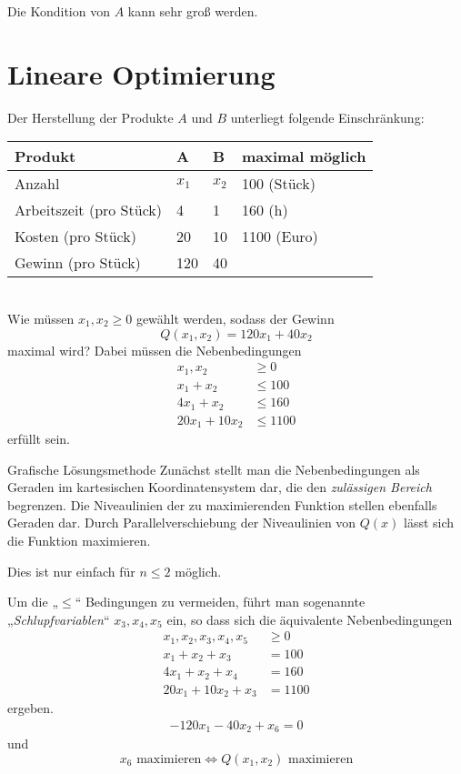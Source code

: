\documentclass{mycourse}
\begin{document}
\begin{note}
	Die Kondition von $A$ kann sehr groß werden.
\end{note}


\section{Lineare Optimierung}


\begin{ex}[Produktionsproblem]
	\label{ex:5.2}
	Der Herstellung der Produkte $A$ und $B$ unterliegt folgende Einschränkung: \\
	\begin{tabular}{l|l|l|l}
		Produkt & A & B & maximal möglich\\
		\hline
		Anzahl & $x_1$ & $x_2$ & 100 (Stück)\\
		Arbeitszeit (pro Stück) & 4 & 1 & 160 (h)\\
		Kosten (pro Stück) & 20 & 10 & 1100 (Euro)\\
		Gewinn (pro Stück) & 120 & 40 & 
	\end{tabular}\\
	Wie müssen $x_1,x_2\ge 0$ gewählt werden, sodass der Gewinn
	\[
		Q(x_1,x_2) = 120x_1 + 40x_2
	\]
	maximal wird?
	Dabei müssen die Nebenbedingungen
	\begin{align*}
		x_1,x_2 &\ge 0\\
		x_1 + x_2 &\le 100\\
		4x_1 + x_2 &\le 160\\
		20x_1 + 10x_2 &\le 1100
	\end{align*}
	erfüllt sein.

	\begin{seg}{Grafische Lösungsmethode}
		Zunächst stellt man die Nebenbedingungen als Geraden im kartesischen Koordinatensystem dar, die den \emph{zulässigen Bereich} begrenzen.
		Die Niveaulinien der zu maximierenden Funktion stellen ebenfalls Geraden dar.
		Durch Parallelverschiebung der Niveaulinien von $Q(x)$ lässt sich die Funktion maximieren.

		Dies ist nur einfach für $n\le2$ möglich.
	\end{seg}
	Um die „$\le$“ Bedingungen zu vermeiden, führt man sogenannte „\emph{Schlupfvariablen}“ $x_3,x_4,x_5$ ein, so dass sich die äquivalente Nebenbedingungen
	\begin{align*}
		x_1,x_2,x_3,x_4,x_5 &\ge 0\\
		x_1 + x_2 + x_3 &= 100\\
		4x_1 + x_2 + x_4 &= 160\\
		20x_1 + 10x_2 + x_3 &= 1100
	\end{align*}
	ergeben.
	\begin{align*}
		-120 x_1 - 40 x_2 + x_6 = 0
	\end{align*}
	und
	\[
		x_6 \text{ maximieren} \iff Q(x_1,x_2) \text{ maximieren}
	\]
\end{ex}
\end{document}
